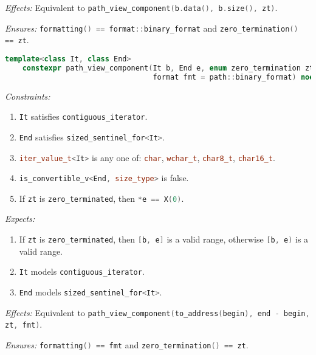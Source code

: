 \documentclass[11pt]{article}
\newcommand{\code}[2][cpp]{\lstinline[language=#1,basicstyle=\small\ttfamily]{#2}}
\newcommand{\desc}[1]{\textit{#1}}
\newcommand{\constraints}{\desc{Constraints: }}
\newcommand{\effects}{\desc{Effects: }}
\newcommand{\expects}{\desc{Expects: }}
\newcommand{\ensures}{\desc{Ensures: }}
\begin{document}
\effects Equivalent to \code{path_view_component(b.data(), b.size(), zt)}.

\ensures \code{formatting() == format::binary_format} and \code{zero_termination() == zt}.\\


\begin{lstlisting}[language=cpp]
    template<class It, class End>
    constexpr path_view_component(It b, End e, enum zero_termination zt,
                                  format fmt = path::binary_format) noexcept;
\end{lstlisting}
\constraints \begin{enumerate}
    \item \code{It} satisfies \code{contiguous_iterator}.
    \item \code{End} satisfies \code{sized_sentinel_for<It>}.
    \item \code{iter_value_t<It>} is any one of: \code{char}, \code{wchar_t}, \code{char8_t}, \code{char16_t}.
    \item \code{is_convertible_v<End, size_type>} is false.
    \item If \code{zt} is \code{zero_terminated}, then \code{*e == X(0)}.
\end{enumerate}
\expects \begin{enumerate}
    \item If \code{zt} is \code{zero_terminated}, then \code{[b, e]} is a valid range, otherwise \code{[b, e)} is a valid range.
    \item \code{It} models \code{contiguous_iterator}.
    \item \code{End} models \code{sized_sentinel_for<It>}.
\end{enumerate}

\effects Equivalent to \code{path_view_component(to_address(begin), end - begin, zt, fmt)}.

\ensures \code{formatting() == fmt} and \code{zero_termination() == zt}.\\
\end{document}

